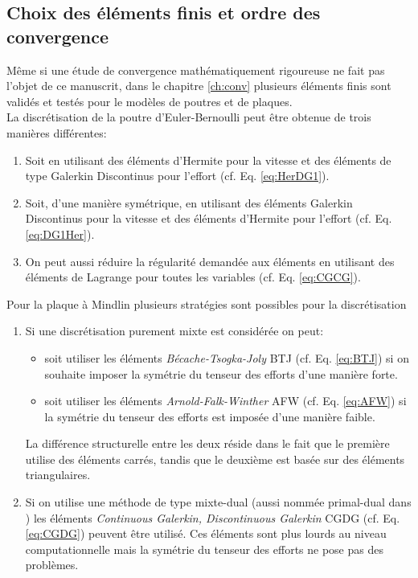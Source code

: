 \subsection*{Choix des éléments finis et ordre des convergence}
 
Même si une étude de convergence mathématiquement rigoureuse ne fait pas l'objet de ce manuscrit, dans le chapitre \ref{ch:conv} plusieurs éléments finis sont validés et testés pour le modèles de poutres et de plaques. \\

La discrétisation de la poutre d'Euler-Bernoulli peut être obtenue de trois manières différentes:
\begin{enumerate}
\item Soit en utilisant des éléments d'Hermite pour la vitesse et des éléments de type Galerkin Discontinus pour l'effort (cf. Eq. \eqref{eq:HerDG1}). 
\item Soit, d'une manière symétrique, en utilisant des éléments Galerkin Discontinus pour la vitesse et des éléments d'Hermite pour l'effort (cf. Eq. \eqref{eq:DG1Her}). 
\item On peut aussi réduire la régularité demandée aux éléments en utilisant des éléments de Lagrange pour toutes les variables (cf. Eq. \eqref{eq:CGCG}).
\end{enumerate}
 
Pour la plaque à Mindlin plusieurs stratégies sont possibles pour la discrétisation
\begin{enumerate}
	\item Si une discrétisation purement mixte est considérée on peut:
	\begin{itemize}
		\item soit utiliser les éléments \textit{Bécache-Tsogka-Joly} BTJ (cf. Eq. \eqref{eq:BTJ}) si on souhaite imposer la symétrie du tenseur des efforts d'une manière forte.
		\item soit utiliser les éléments \textit{Arnold-Falk-Winther} AFW (cf. Eq. \eqref{eq:AFW}) si la symétrie du tenseur des efforts est imposée d'une manière faible.
	\end{itemize}  
	La différence structurelle entre les deux réside dans le fait que le première utilise des éléments carrés, tandis que le deuxième est basée sur des éléments triangulaires.
	\item Si on utilise une méthode de type mixte-dual (aussi nommée primal-dual dans \cite{joly2003variational}) les éléments \textit{Continuous Galerkin, Discontinuous Galerkin} CGDG (cf. Eq. \eqref{eq:CGDG}) peuvent être utilisé. Ces éléments sont plus lourds au niveau computationnelle mais la symétrie du tenseur des efforts ne pose pas des problèmes.
\end{enumerate}

